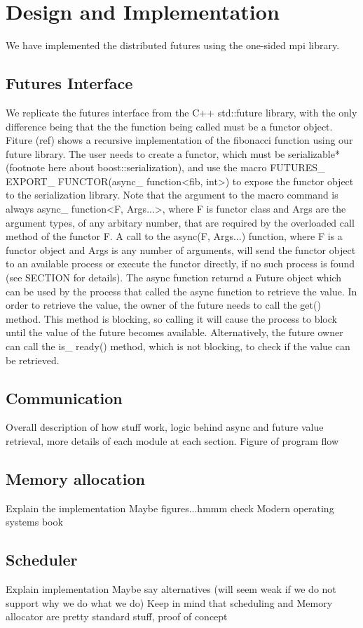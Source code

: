 \chapter{Design and Implementation}

	We have implemented the distributed futures using the one-sided mpi library.  

\section{Futures Interface}
We replicate the futures interface from the C++ std::future library, with the only difference being that 
the the function being called must be a functor object.  Fiture (ref) shows a recursive implementation
of the fibonacci function using our future library.  The user needs to create a functor, which must be
serializable*(footnote here about boost::serialization), and use the macro 
FUTURES\_ EXPORT\_ FUNCTOR(async\_ function<fib, int>) to expose the functor object to the serialization library.
Note that the argument to the macro command is always async\_ function<F, Args...>, where F is functor class
and Args are the argument types, of any arbitary number, that are required by the overloaded call method 
of the functor F.  A call to the async(F, Args...) function, where F is a functor object and Args is any number of arguments,
will send the functor object to an available process or execute 
the functor directly, if no such process is found (see SECTION for details). The async function returnd a 
Future object which can be used by the process that called the async function to retrieve the value.  
In order to retrieve the value,
the owner of the future needs to call the get() method.  This method is blocking, so calling it will cause the 
process to block until the value of the future becomes available.  Alternatively, the future owner can call the
is\_ ready() method, which is not blocking, to check if the value can be retrieved. 

\section{Communication}
Overall description of how stuff work, logic behind async and future value retrieval, more details of each module
at each section. Figure of program flow

\section{Memory allocation}
Explain the implementation
Maybe figures...hmmm check Modern operating systems book

\section{Scheduler}
Explain implementation
Maybe say alternatives (will seem weak if we do not support why we do what we do)
Keep in mind that scheduling and Memory allocator are pretty standard stuff, proof of concept
